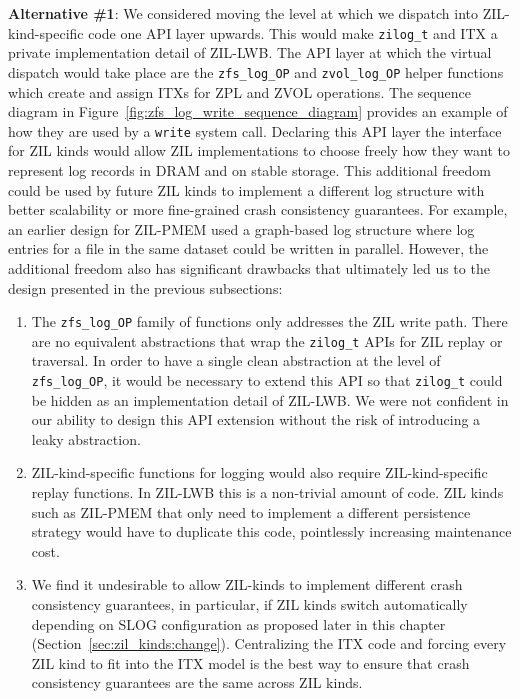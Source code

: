 \documentclass[12pt,a4paper,twoside]{book}
\begin{document}
\textbf{Alternative \#1}: We considered moving the level at which we dispatch into ZIL-kind-specific code one API layer upwards.
This would make \lstinline{zilog_t} and ITX a private implementation detail of ZIL-LWB.
The API layer at which the virtual dispatch would take place are the \lstinline{zfs_log_OP} and \lstinline{zvol_log_OP} helper functions which create and assign ITXs for ZPL and ZVOL operations.
The sequence diagram in Figure~\ref{fig:zfs_log_write_sequence_diagram} provides an example of how they are used by a \lstinline{write} system call.
Declaring this API layer the interface for ZIL kinds would allow ZIL implementations to choose freely how they want to represent log records in DRAM and on stable storage.
This additional freedom could be used by future ZIL kinds to implement a different log structure with better scalability or more fine-grained crash consistency guarantees.
For example, an earlier design for ZIL-PMEM used a graph-based log structure where log entries for a file in the same dataset could be written in parallel.
However, the additional freedom also has significant drawbacks that ultimately led us to the design presented in the previous subsections:
\begin{enumerate}[noitemsep]
    \item The \lstinline{zfs_log_OP} family of functions only addresses the ZIL write path.
        There are no equivalent abstractions that wrap the \lstinline{zilog_t} APIs for ZIL replay or traversal.
        In order to have a single clean abstraction at the level of \lstinline{zfs_log_OP}, it would be necessary to extend this API so that \lstinline{zilog_t} could be hidden as an implementation detail of ZIL-LWB.
        We were not confident in our ability to design this API extension without the risk of introducing a leaky abstraction.
    \item ZIL-kind-specific functions for logging would also require ZIL-kind-specific replay functions.
        In ZIL-LWB this is a non-trivial amount of code.
        ZIL kinds such as ZIL-PMEM that only need to implement a different persistence strategy would have to duplicate this code, pointlessly increasing maintenance cost.
    \item We find it undesirable to allow ZIL-kinds to implement different crash consistency guarantees, in particular, if ZIL kinds switch automatically depending on SLOG configuration as proposed later in this chapter (Section~\ref{sec:zil_kinds:change}).
        Centralizing the ITX code and forcing every ZIL kind to fit into the ITX model is the best way to ensure that crash consistency guarantees are the same across ZIL kinds.
\end{enumerate}
\end{document}
